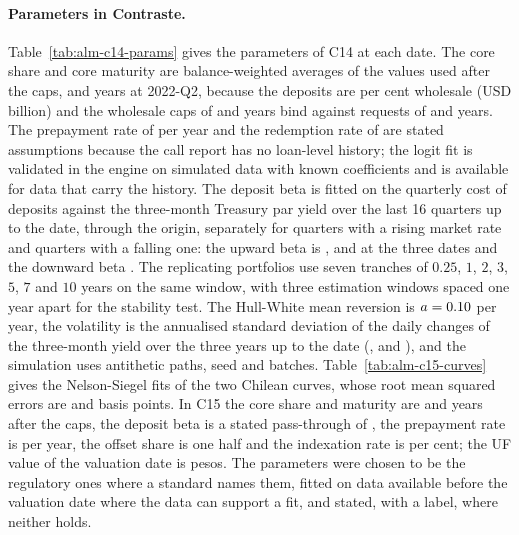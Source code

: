 \paragraph{Parameters in Contraste.}
Table~\ref{tab:alm-c14-params} gives the parameters of C14 at each date. The core share and core maturity are balance-weighted averages of the values used after the caps, \almCCoreShareB{} and \almCCoreMatB{} years at 2022-Q2, because the deposits are \almCWholesaleShare{} per cent wholesale (USD \almCWholesaleBn{} billion) and the wholesale caps of \almCCapWholesaleShare{} and \almCCapWholesaleMat{} years bind against requests of \almCRequestWholesaleShare{} and \almCRequestWholesaleMat{} years. The prepayment rate of \almCPrepay{} per year and the redemption rate of \almCTdrr{} are stated assumptions because the call report has no loan-level history; the logit fit is validated in the engine on simulated data with known coefficients and is available for data that carry the history. The deposit beta is fitted on the quarterly cost of deposits against the three-month Treasury par yield over the last 16 quarters up to the date, through the origin, separately for quarters with a rising market rate and quarters with a falling one: the upward beta is \almCBetaA{}, \almCBetaB{} and \almCBetaC{} at the three dates and the downward beta \almCBetaDown{}. The replicating portfolios use seven tranches of $0.25$, $1$, $2$, $3$, $5$, $7$ and $10$ years on the same window, with three estimation windows spaced one year apart for the stability test. The Hull-White mean reversion is $a=0.10{}$ per year, the volatility is the annualised standard deviation of the daily changes of the three-month yield over the three years up to the date (\almCSigmaA{}, \almCSigmaB{} and \almCSigmaC{}), and the simulation uses \almCPaths{} antithetic paths, seed \almCSeed{} and \almCBatches{} batches. Table~\ref{tab:alm-c15-curves} gives the Nelson-Siegel fits of the two Chilean curves, whose root mean squared errors are \almDRmseClp{} and \almDRmseUr{} basis points. In C15 the core share and maturity are \almDCoreShare{} and \almDCoreMat{} years after the caps, the deposit beta is a stated pass-through of \almDBeta{}, the prepayment rate is \almDPrepay{} per year, the offset share is one half and the indexation rate is \almDChargeRate{} per cent; the UF value of the valuation date is \almDUfValue{} pesos. The parameters were chosen to be the regulatory ones where a standard names them, fitted on data available before the valuation date where the data can support a fit, and stated, with a label, where neither holds.

